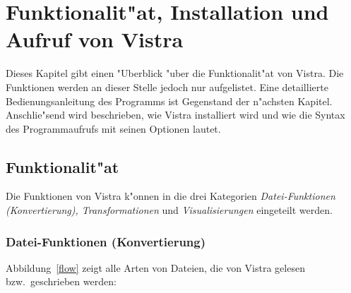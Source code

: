 \section[Funktionalit"at, Installation und Aufruf]{Funktionalit"at, 
Installation und Aufruf von Vistra}
\label{funk}

Dieses Kapitel gibt einen "Uberblick "uber die Funktionalit"at
von Vistra. 
Die Funktionen werden an dieser Stelle jedoch nur aufgelistet.
Eine detaillierte Bedienungsanleitung des Programms ist 
Gegenstand der n"achsten Kapitel.
Anschlie"send wird beschrieben, wie Vistra installiert wird und
wie die Syntax des Programmaufrufs mit seinen Optionen lautet.
 
\subsection{Funktionalit"at}
Die Funktionen von Vistra k"onnen in die drei Kategorien
{\sl Datei-Funktionen (Konvertierung), Transformationen} und
{\sl Visualisierungen} eingeteilt werden.

\subsubsection*{Datei-Funktionen (Konvertierung)}

Abbildung~\ref{flow} zeigt alle Arten von Dateien, die von Vistra
gelesen bzw.~geschrieben werden:

